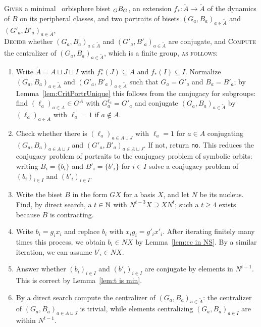 \documentclass{amsart}
\newcommand\wtA{{\widetilde A}}
\begin{document}
\begin{algo}\label{algo:conjportraitexp}
  \textsc{Given} a minimal \Exp\ orbisphere biset $\subscript G B_G$, an extension $f_*\colon\wtA\to\wtA$ of the dynamics of $B$ on its peripheral classes, and two portraits of bisets $(G_a,B_a)_{a\in\wtA}$ and $(G'_a,B'_a)_{a\in\wtA}$,\\
  \textsc{Decide} whether $(G_a,B_a)_{a\in\wtA}$ and
  $(G'_a,B'_a)_{a\in\wtA}$ are conjugate, and \textsc{Compute}
  the centralizer of $(G_a,B_a)_{a\in\wtA}$, which is a finite
  group, \textsc{as follows:}\\\upshape
  \begin{enumerate}
  \item Write $\wtA=A\sqcup J\sqcup I$ with
    $f_*^n(J)\subseteq A$ and $f_*(I)\subseteq I$. Normalize
    $(G_a,B_a)_{a\in\wtA}$ and
    $(G'_a,B'_a)_{a\in\wtA}$ such that $G_a=G'_a$ and
    $B_a=B'_a$; by Lemma~\ref{lem:CritPortrUnique} this follows from
    the conjugacy for subgroups: find $(\ell_a)_{a\in A}\in G^A$ with
    $G^{\ell_a}_a=G'_a$ and conjugate $(G_a,B_a)_{a\in\wtA}$
    by $(\ell_a)_{a\in \wtA}$ with $\ell_a=1$ if
    $a\not\in A$.
  \item Check whether there is $(\ell_a)_{a\in A\sqcup J}$ with
    $\ell_a=1$ for $a\in A$ conjugating $(G_a,B_a)_{a\in A\sqcup J}$
    and $(G'_a,B'_a)_{a\in A\sqcup J}$. If not, return
    \texttt{no}. This reduces the conjugacy problem of portraits to
    the conjugacy problem of symbolic orbits: writing $B_i=\{b_i\}$
    and $B'_i=\{b'_i\}$ for $i\in I$ solve a conjugacy problem of
    $(b_i)_{i\in I}$ and $(b'_i)_{i\in I}$.

  \item Write the biset $B$ in the form $G X$ for a basis $X$, and let
    $N$ be its nucleus. Find, by direct search, a $t\in{\mathbb N}$ with
    $N^{t-3}X\supseteq X N^t$; such a $t\ge4$ exists because $B$ is
    contracting.
  \item Write $b_i=g_ix_i$ and replace $b_i$ with $x_i g_i=g'_i
    x'_i$. After iterating finitely many times this process, we obtain
    $b_i\in N X$ by Lemma~\ref{lem:cc in NS}. By a similar iteration,
    we can assume $b'_i\in N X$.\label{st:4:algo:conjportraitexp}
  \item Answer whether $(b_i)_{i\in I}$ and $(b'_i)_{i\in I}$ are conjugate by elements in $N^{t-1}$. This is correct by Lemma~\ref{lem:t is min}.
  \item By a direct search compute the centralizer of
    $(G_a,B_a)_{a\in \wtA}$: the centralizer of
    $(G_a,B_a)_{a\in A\sqcup J}$ is trivial, while elements
    centralizing $(G_a,B_a)_{a\in I}$ are within $N^{t-1}$.
  \end{enumerate}
\end{algo}
\end{document}
